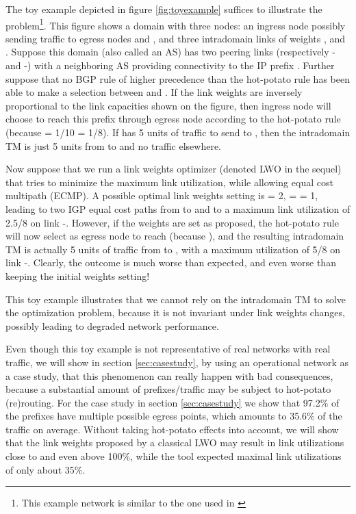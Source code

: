 \documentclass{acm_proc_article-sp}
\begin{document}
The toy example depicted in figure \ref{fig:toyexample} suffices to
illustrate the problem\footnote{This example network is similar to the
one used in \cite{selin}}. This figure shows a domain with three nodes:
an ingress node  possibly sending traffic to egress nodes  and
, and three intradomain links of weights ,  and . Suppose
this domain (also called an AS) has two peering links (respectively
- and -) with a neighboring AS providing connectivity to
the IP prefix . Further suppose that no BGP rule of higher
precedence than the hot-potato rule has been able to make a selection
between  and . If the link weights are inversely proportional to
the link capacities shown on the figure, then ingress node  will
choose to reach this prefix through egress node  according to the
hot-potato rule (because  = 1/10   = 1/8). If  has 5 units
of traffic to send to , then the intradomain TM is just 5 units
from  to  and no traffic elsewhere. 

Now suppose that we run a link weights optimizer (denoted LWO in the sequel) that tries to
minimize the maximum link utilization, while allowing equal cost
multipath (ECMP)\cite{OSPF}. A possible optimal link weights setting
is { = 2,  =  = 1}, leading to two IGP equal cost paths from
 to  and to a maximum link utilization of 2.5/8 on link
-. However, if the weights are set as proposed, the hot-potato
rule will now select  as egress node to reach  (because  
), and the resulting intradomain TM is actually 5 units of traffic
from  to , with a maximum utilization of 5/8 on link
-. Clearly, the outcome is much worse than expected, and even
worse than keeping the initial weights setting! 

This toy example illustrates that we cannot rely on the intradomain TM
to solve the optimization problem, because it is not invariant under
link weights changes, possibly leading to degraded network
performance. 

Even though this toy example is not representative of real networks
with real traffic, we will show in section \ref{sec:casestudy}, by using an operational
network as a case study, that this phenomenon can really happen with
bad consequences, because a substantial
amount of prefixes/traffic may be subject to hot-potato (re)routing. 
For the case study in section \ref{sec:casestudy} we show that 97.2\% of the prefixes
have multiple possible egress points, which amounts to 35.6\% of the traffic
on average. Without taking hot-potato effects into account, we will show that the link
weights proposed by a classical LWO 
may result in link utilizations close to and even above 100\%,
while the tool expected maximal 
link utilizations of only about 35\%.
\end{document}
